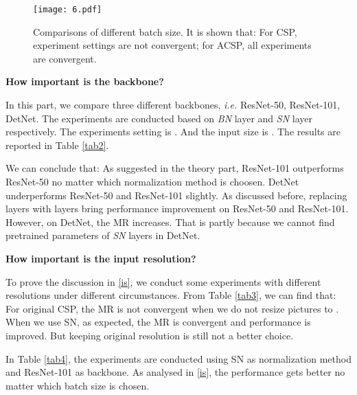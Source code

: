\documentclass[twocolumn]{article}
\begin{document}
\begin{figure}[h]
\centering
\texttt{[image: 6.pdf]}
\caption{Comparisons of different batch size. It is shown that: For CSP\cite{liu2019high},  experiment settings are not convergent; for ACSP, all experiments are convergent.}
\label{fig:4}
\end{figure}





\textbf{How important is the backbone?}\par 
In this part, we compare three different backbones, \textit{i.e.} ResNet-50\cite{luo2018differentiable}, ResNet-101\cite{luo2018differentiable}, DetNet\cite{li2018detnet}. The experiments are conducted based on \textit{BN} layer and \textit{SN} layer respectively. The experiments setting is . And the input size is . The results are reported in Table \ref{tab2}.\par 
We can conclude that:  As suggested in the theory part, ResNet-101\cite{luo2018differentiable} outperforms ResNet-50\cite{luo2018differentiable} no matter which normalization method is choosen.  DetNet\cite{li2018detnet} underperforms ResNet-50\cite{luo2018differentiable} and ResNet-101\cite{luo2018differentiable} slightly.  As discussed before, replacing  layers with  layers bring performance improvement on ResNet-50\cite{luo2018differentiable} and ResNet-101\cite{luo2018differentiable}. However, on DetNet\cite{li2018detnet}, the MR increases. That is partly because we cannot find pretrained parameters of  \textit{SN} layers in DetNet\cite{li2018detnet}.

\textbf{How important is the input resolution?}\par 
To prove the discussion in \ref{is}, we conduct some experiments with different resolutions under different circumstances. From Table \ref{tab3}, we can find that: For original CSP\cite{liu2019high}, the MR is not convergent when we do not resize pictures to . When we use SN, as expected, the MR is convergent and performance is improved. But keeping original resolution is still not a better choice.\par 
In Table \ref{tab4}, the experiments are conducted using SN as normalization method and ResNet-101 as backbone. As analysed in \ref{is}, the performance gets better no matter which batch size is chosen.
\end{document}
